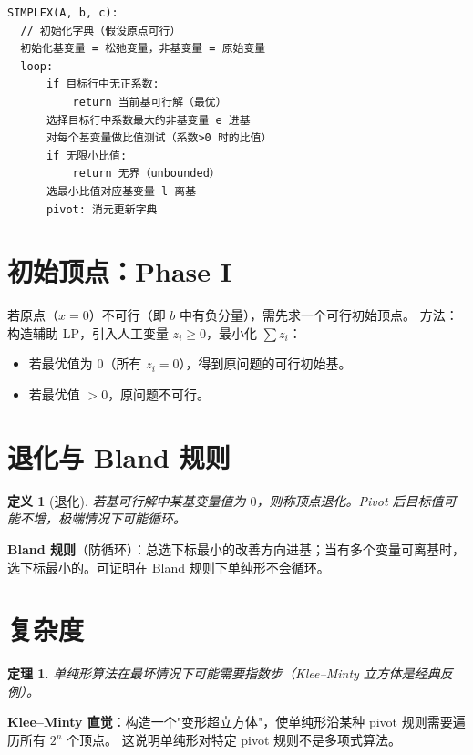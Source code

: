 \documentclass[UTF8,openany,12pt]{ctexbook}
\newtheorem{definition}{定义}[chapter]
\newtheorem{theorem}{定理}[chapter]
\theoremstyle{remark}
\begin{document}
\begin{lstlisting}
SIMPLEX(A, b, c):
  // 初始化字典（假设原点可行）
  初始化基变量 = 松弛变量，非基变量 = 原始变量
  loop:
      if 目标行中无正系数:
          return 当前基可行解（最优）
      选择目标行中系数最大的非基变量 e 进基
      对每个基变量做比值测试（系数>0 时的比值）
      if 无限小比值:
          return 无界（unbounded）
      选最小比值对应基变量 l 离基
      pivot: 消元更新字典
\end{lstlisting}

\section{初始顶点：Phase I}

若原点（$x=0$）不可行（即 $b$ 中有负分量），需先求一个可行初始顶点。
方法：构造辅助 LP，引入人工变量 $z_i\ge0$，最小化 $\sum z_i$：
\begin{itemize}
  \item 若最优值为 $0$（所有 $z_i=0$），得到原问题的可行初始基。
  \item 若最优值 $>0$，原问题不可行。
\end{itemize}

\section{退化与 Bland 规则}

\begin{definition}[退化]
若基可行解中某基变量值为 $0$，则称顶点\emph{退化}。Pivot 后目标值可能不增，极端情况下可能循环。
\end{definition}

\noindent\textbf{Bland 规则}（防循环）：总选下标最小的改善方向进基；当有多个变量可离基时，选下标最小的。可证明在 Bland 规则下单纯形不会循环。

\section{复杂度}

\begin{theorem}
单纯形算法在最坏情况下可能需要指数步（Klee--Minty 立方体是经典反例）。
\end{theorem}

\noindent\textbf{Klee--Minty 直觉}：构造一个"变形超立方体"，使单纯形沿某种 pivot 规则需要遍历所有 $2^n$ 个顶点。
这说明单纯形对特定 pivot 规则不是多项式算法。
\end{document}
